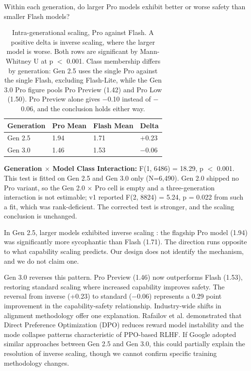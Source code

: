 \documentclass[sigconf,screen]{acmart}
\begin{document}
Within each generation, do larger Pro models exhibit better or worse safety than smaller Flash models?

\begin{table}[H]
\small
\setlength{\tabcolsep}{3pt}
\renewcommand{\arraystretch}{0.9}
\begin{tabularx}{\linewidth}{l X X X}
\toprule
Generation & Pro Mean & Flash Mean & Delta \\
\midrule
Gen 2.5 & 1.94 & 1.71 & $+$0.23 \\
Gen 3.0 & 1.46 & 1.53 & $-$0.06 \\
\bottomrule
\end{tabularx}
\caption{Intra-generational scaling, Pro against Flash. A positive delta is inverse scaling, where the larger model is worse. Both rows are significant by Mann-Whitney U at p $<$ 0.001. Class membership differs by generation: Gen 2.5 uses the single Pro against the single Flash, excluding Flash-Lite, while the Gen 3.0 Pro figure pools Pro Preview (1.42) and Pro Low (1.50). Pro Preview alone gives $-$0.10 instead of $-$0.06, and the conclusion holds either way.}
\label{tab:scaling}
\end{table}

\textbf{Generation $\times$ Model Class Interaction:} F(1, 6486) = 18.29, p $<$ 0.001. This test is fitted on Gen 2.5 and Gen 3.0 only (N=6,490). Gen 2.0 shipped no Pro variant, so the Gen 2.0 $\times$ Pro cell is empty and a three-generation interaction is not estimable; v1 reported F(2, 8824) = 5.24, p = 0.022 from such a fit, which was rank-deficient. The corrected test is stronger, and the scaling conclusion is unchanged.

In Gen 2.5, larger models exhibited inverse scaling \cite{ref9}: the flagship Pro model (1.94) was significantly more sycophantic than Flash (1.71). The direction runs opposite to what capability scaling predicts. Our design does not identify the mechanism, and we do not claim one.

Gen 3.0 reverses this pattern. Pro Preview (1.46) now outperforms Flash (1.53), restoring standard scaling where increased capability improves safety. The reversal from inverse (+0.23) to standard ($-$0.06) represents a 0.29 point improvement in the capability-safety relationship. Industry-wide shifts in alignment methodology offer one explanation. Rafailov et al. \cite{ref19} demonstrated that Direct Preference Optimization (DPO) reduces reward model instability and the mode collapse patterns characteristic of PPO-based RLHF. If Google adopted similar approaches between Gen 2.5 and Gen 3.0, this could partially explain the resolution of inverse scaling, though we cannot confirm specific training methodology changes.
\end{document}
